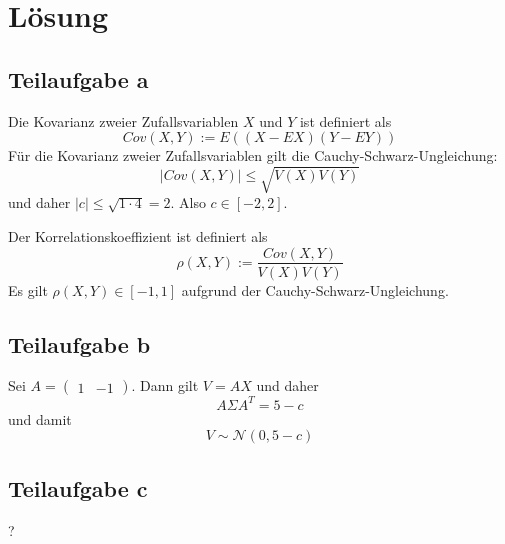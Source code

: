 \section*{Lösung}
\subsection*{Teilaufgabe a}
Die Kovarianz zweier Zufallsvariablen $X$ und $Y$ ist definiert als
\[Cov(X, Y) := E((X - EX) (Y - EY))\]
Für die Kovarianz zweier Zufallsvariablen gilt die Cauchy-Schwarz-Ungleichung:
\[|Cov(X, Y)| \leq \sqrt{V(X) V(Y)}\]
und daher $|c| \leq \sqrt{1 \cdot 4} = 2$. Also $c \in [-2, 2]$.

Der Korrelationskoeffizient ist definiert als
\[\rho(X, Y) := \frac{Cov(X, Y)}{V(X) V(Y)}\]
Es gilt $\rho(X, Y) \in [-1, 1]$ aufgrund der Cauchy-Schwarz-Ungleichung.

\subsection*{Teilaufgabe b}
Sei $A = \begin{pmatrix}1 & -1\end{pmatrix}$. Dann gilt $V = A X$ und daher
$$A \Sigma A^T = 5 - c$$ und damit
$$V \sim \mathcal{N}(0, 5 - c)$$

\subsection*{Teilaufgabe c}
?

